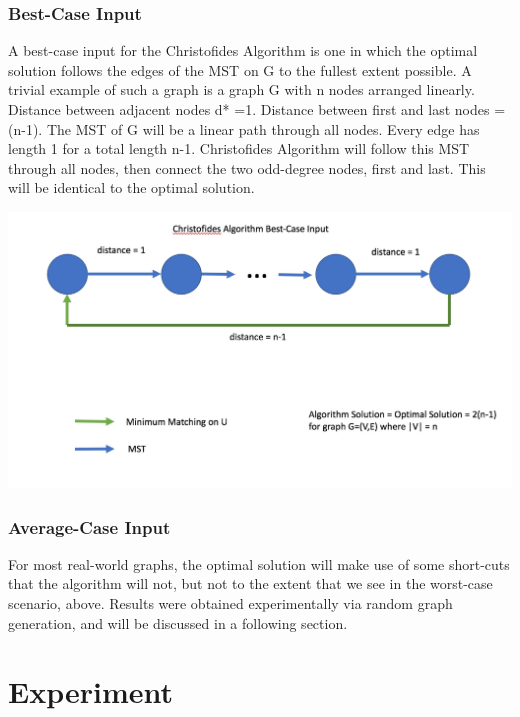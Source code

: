 \documentclass[12pt, oneside]{article}   	%
\begin{document}
\subsubsection{Best-Case Input}
\indent\indent A best-case input for the Christofides Algorithm is one in which the optimal solution follows the edges of the MST on G to the fullest extent possible.  A trivial example of such a graph is a graph G with n nodes arranged linearly.  Distance between adjacent nodes d* =1.  Distance between first and last nodes = (n-1).  The MST of G will be a linear path through all nodes.  Every edge has length 1 for a total length n-1.  Christofides Algorithm will follow this MST through all nodes, then connect the two odd-degree nodes, first and last.  This will be identical to the optimal solution.\\
\begin{center}
\includegraphics[scale=0.3]{best}
\end{center}
\subsubsection{Average-Case Input}
\indent\indent For most real-world graphs, the optimal solution will make use of some short-cuts that the algorithm will not, but not to the extent that we see in the worst-case scenario, above.  Results were obtained experimentally via random graph generation, and will be discussed in a following section.\\
\section{Experiment}
\end{document}
